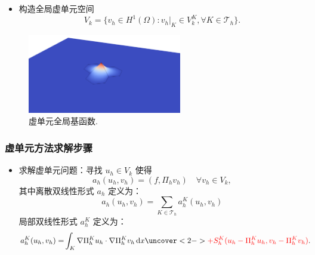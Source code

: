 \documentclass[notheorems,serif]{beamer}
\begin{document}
\begin{frame}
    \begin{itemize}
        \item 构造全局虚单元空间
            $$
            V_k = \{v_h \in H^1(\Omega): v_h|_K \in V_k^K, \forall K \in
            \mathcal{T}_h\}.
            $$
    \end{itemize}
    \begin{figure}[htpb]
        \centering
        \includegraphics[width=0.6\textwidth]{../figures/vemfunction_global.png}
        \caption{虚单元全局基函数.}
    \end{figure}
\end{frame}

\begin{frame}
\frametitle{虚单元方法求解步骤}

\begin{itemize}
\item 求解虚单元问题：寻找 $u_h \in V_k$ 使得
$$
a_h(u_h, v_h) = (f, \Pi_h v_h) \quad \forall v_h \in V_k,
$$
其中离散双线性形式 $a_h$ 定义为：
$$
a_h(u_h, v_h) = \sum_{K \in \mathcal{T}_h} a_h^K(u_h, v_h) 
$$
局部双线性形式 $a_h^K$ 定义为：
$$
\begin{aligned}
a_h^K(u_h, v_h) = & \int_K \nabla \Pi_h^K u_h \cdot \nabla \Pi_h^K v_h \, \mathrm{d}x
\uncover<2->{
\highlightit{+ S_h^K(u_h - \Pi_h^K u_h, v_h - \Pi_h^K v_h)}.
}
\end{aligned}
$$
\end{itemize}
\end{frame}
\end{document}

